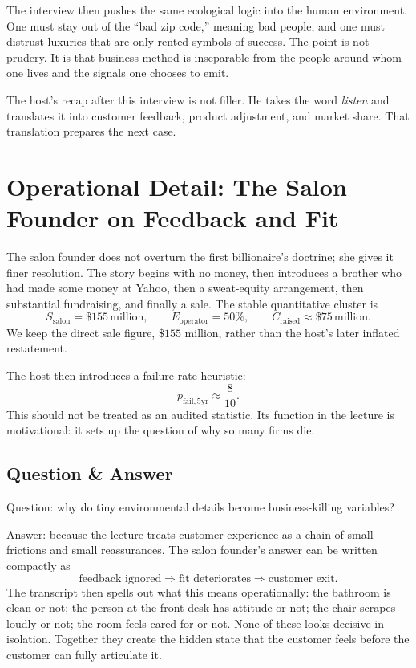 The interview then pushes the same ecological logic into the human environment. One must stay out of the ``bad zip code,'' meaning bad people, and one must distrust luxuries that are only rented symbols of success. The point is not prudery. It is that business method is inseparable from the people around whom one lives and the signals one chooses to emit.

The host's recap after this interview is not filler. He takes the word \emph{listen} and translates it into customer feedback, product adjustment, and market share. That translation prepares the next case.

\section{Operational Detail: The Salon Founder on Feedback and Fit}

The salon founder does not overturn the first billionaire's doctrine; she gives it finer resolution. The story begins with no money, then introduces a brother who had made some money at Yahoo, then a sweat-equity arrangement, then substantial fundraising, and finally a sale. The stable quantitative cluster is
\begin{equation}
S_{\text{salon}} = \$155\,\text{million}, \qquad E_{\text{operator}} = 50\%, \qquad C_{\text{raised}} \approx \$75\,\text{million}.
\end{equation}
We keep the direct sale figure, \(\$155\) million, rather than the host's later inflated restatement.

The host then introduces a failure-rate heuristic:
\begin{equation}
p_{\text{fail},5\text{yr}} \approx \frac{8}{10}.
\end{equation}
This should not be treated as an audited statistic. Its function in the lecture is motivational: it sets up the question of why so many firms die.

\subsection{Question \& Answer}

Question: why do tiny environmental details become business-killing variables?

Answer: because the lecture treats customer experience as a chain of small frictions and small reassurances. The salon founder's answer can be written compactly as
\begin{equation}
\text{feedback ignored} \Rightarrow \text{fit deteriorates} \Rightarrow \text{customer exit}.
\end{equation}
The transcript then spells out what this means operationally: the bathroom is clean or not; the person at the front desk has attitude or not; the chair scrapes loudly or not; the room feels cared for or not. None of these looks decisive in isolation. Together they create the hidden state that the customer feels before the customer can fully articulate it.

